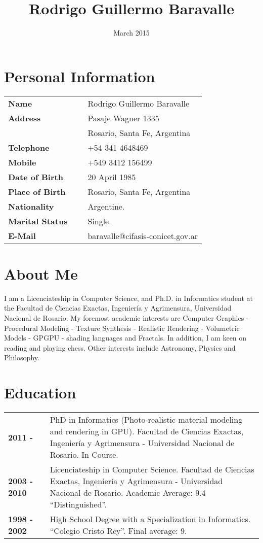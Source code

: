 \documentclass[a4paper,12pt]{article}
\title{Rodrigo Guillermo Baravalle}
\date{March 2015}
\begin{document}
\maketitle
\section*{Personal Information}

\begin{tabular}{lcl}
\bf{Name} & & Rodrigo Guillermo Baravalle\\
\bf{Address} & & Pasaje Wagner 1335\\ &\ & Rosario, Santa Fe, Argentina\\
\bf{Telephone}& &+54 341 4648469\\
\bf{Mobile} & & +549 3412 156499 \\
\bf{Date of Birth} & & 20 April 1985\\
\bf{Place of Birth} & & Rosario, Santa Fe, Argentina\\
\bf{Nationality} & & Argentine.\\
\bf{Marital Status} & & Single.\\
\bf{E-Mail}& &baravalle@cifasis-conicet.gov.ar\\
\end{tabular}

\section*{About Me}
\begin{small}
\noindent
I am a Licenciateship in Computer Science, and Ph.D. in Informatics student at the Facultad de Ciencias Exactas, Ingenier\'ia y Agrimensura, Universidad Nacional de Rosario.
My foremost academic interests are Computer Graphics - Procedural Modeling - Texture Synthesis - Realistic Rendering - Volumetric Models - GPGPU - shading languages and Fractals. 
In addition, I am keen on reading and playing chess.
Other interests include Astronomy, Physics and Philosophy.
\end{small}


\section*{Education}

\begin{tabular}{lcp{9 cm}}
		\bf{2011 - } & & PhD in Informatics (Photo-realistic material modeling and rendering in GPU). Facultad de Ciencias Exactas, Ingenier\'ia y Agrimensura - Universidad Nacional de Rosario. In Course.\\
		\bf{2003 - 2010} & & Licenciateship in Computer Science. Facultad de Ciencias Exactas, Ingenier\'ia y Agrimensura - Universidad Nacional de Rosario. Academic Average: 9.4 ``Distinguished''.\\
		\bf{1998 - 2002} & & High School Degree with a Specialization in Informatics. ``Colegio Cristo Rey''. Final average: 9.\\
\end{tabular}
\end{document}
